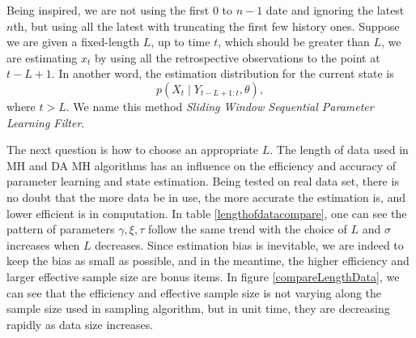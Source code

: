 Being inspired, we are not using the first $0$ to $n-1$ date and ignoring the latest $n$th, but using all the latest with truncating the first few history ones. Suppose we are given a fixed-length $L$, up to time $t$, which should be greater than $L$, we are estimating $x_t$ by using all the retrospective observations to the point at $t-L+1$. In another word, the estimation distribution for the current state is 
\begin{equation}
p(X_{t}\mid Y_{t-L+1:t},\theta),
\end{equation}
where $t>L$. We name this method \textit{Sliding Window Sequential Parameter Learning Filter}. 

The next question is how to choose an appropriate $L$. The length of data used in MH and DA MH algorithms has an influence on the efficiency and accuracy of parameter learning and state estimation. Being tested on real data set, there is no doubt that the more data be in use, the more accurate the estimation is, and lower efficient is in computation. In table \ref{lengthofdatacompare}, one can see the pattern of parameters $\gamma,\xi,\tau$ follow the same trend with the choice of $L$ and $\sigma$ increases when $L$ decreases. Since estimation bias is inevitable, we are indeed to keep the bias as small as possible, and in the meantime, the higher efficiency and larger effective sample size are bonus items. In figure \ref{compareLengthData}, we can see that the efficiency and effective sample size is not varying along the sample size used in sampling algorithm, but in unit time, they are decreasing rapidly as data size increases. 
